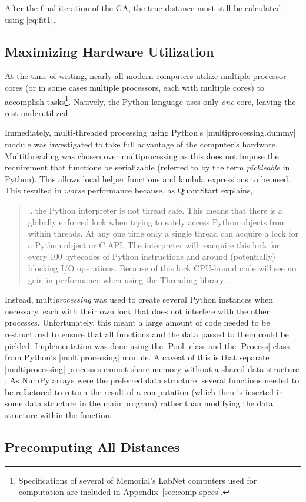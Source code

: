 After the final iteration of the GA, the true distance must still be calculated
using \eqref{eq:fit1}.

\subsection{Maximizing Hardware Utilization}
At the time of writing, nearly all modern computers utilize multiple processor
cores (or in some cases multiple processors, each with multiple cores) to 
accomplish tasks\footnote{Specifications of several of Memorial's LabNet 
computers used for computation are included in Appendix~\ref{sec:comp-specs}.}.
Natively, the Python language uses only {\em one} core, leaving the rest 
underutilized. 

Immediately, multi-threaded processing using Python's 
|multiprocessing.dummy| module was investigated to take full 
advantage of the computer's hardware. Multithreading was chosen over
multiprocessing as this does not impose the requirement that functions 
be serializable (referred to by the term {\em pickleable} in Python). This 
allows local helper functions and lambda expressions to be used.
This resulted in {\em worse} performance because, as QuantStart explains,
\begin{quote}
	...the Python interpreter is not thread safe. This means that there is a
	globally enforced lock when trying to safely access Python objects from 
	within threads. At any one time only a single thread can acquire a lock 
	for a Python object or C API. The interpreter will reacquire this lock for 
	every 100 bytecodes of Python instructions and around (potentially) 
	blocking I/O operations. Because of this lock CPU-bound code will see 
	no gain in performance when using the Threading library\ldots
	\cite{quantstart}
\end{quote}
Instead, multi{\em processing} was used to create several Python instances
when necessary, each with their own lock that does not interfere with the
other processes. Unfortunately, this meant a large amount of code needed
to be restructured to ensure that all functions and the data passed to them
could be pickled. Implementation was done using the |Pool| class and the
|Process| class from Python's |multiprocessing| module. A caveat of this 
is that separate |multiprocessing| processes cannot share memory without
a shared data structure \cite{wang}. As NumPy arrays were the preferred data
structure, several functions needed to be refactored to return the result
of a computation (which then is inserted in some data structure in the main 
program) rather than modifying the data structure within the function.





\subsection{Precomputing All Distances}\label{ssec:precomputing}

